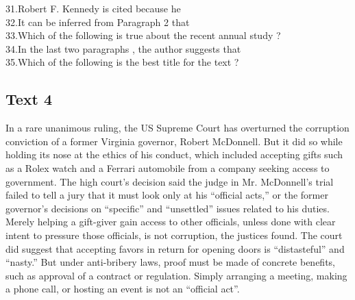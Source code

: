 \begin{questions} \question 31.Robert F. Kennedy is cited because he 
\\ \question 32.It can be inferred from Paragraph 2 that 
\\ \question  33.Which of the following is true about the recent annual study ? 
\\ \question 34.In the last two paragraphs , the author suggests that 
\\ \question 35.Which of the following is the best title for the text ? 
\\ \end{questions}      \subsection{Text 4} 
In a rare unanimous ruling, the US Supreme Court has overturned the corruption conviction of a former Virginia governor, Robert McDonnell. But it did so while holding its nose at the ethics of his conduct, which included accepting gifts such as a Rolex watch and a Ferrari automobile from a company seeking access to government. 
The high court’s decision said the judge in Mr. McDonnell’s trial failed to tell a jury that it must look only at his “official acts,” or the former governor’s decisions on “specific” and “unsettled” issues related to his duties. 
Merely helping a gift-giver gain access to other officials, unless done with clear intent to pressure those officials, is not corruption, the justices found. 
The court did suggest that accepting favors in return for opening doors is “distasteful” and “nasty.” But under anti-bribery laws, proof must be made of concrete benefits, such as approval of a contract or regulation. Simply arranging a meeting, making a phone call, or hosting an event is not an “official act”. 
